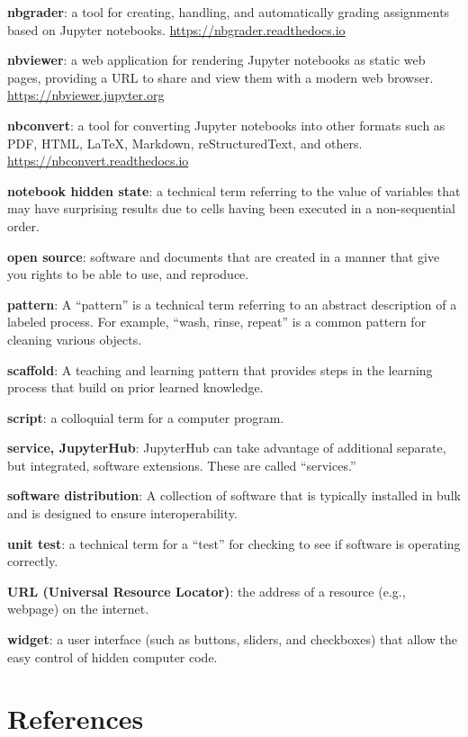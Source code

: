 \documentclass[]{book}
\begin{document}
\textbf{nbgrader}: a tool for creating, handling, and automatically grading assignments
based on Jupyter notebooks. \url{https://nbgrader.readthedocs.io}

\textbf{nbviewer}: a web application for rendering Jupyter notebooks as static web pages,
providing a URL to share and view them with a modern web browser. \url{https://nbviewer.jupyter.org}

\textbf{nbconvert}: a tool for converting Jupyter notebooks into other formats such as
PDF, HTML, LaTeX, Markdown, reStructuredText, and others. \url{https://nbconvert.readthedocs.io}

\textbf{notebook hidden state}: a technical term referring to the value of variables
that may have surprising results due to cells having been executed in a non-sequential order.

\textbf{open source}: software and documents that are created in a manner that give you
rights to be able to use, and reproduce.

\textbf{pattern}: A ``pattern'' is a technical term referring to an abstract description
of a labeled process. For example, ``wash, rinse, repeat'' is a common pattern for
cleaning various objects.

\textbf{scaffold}: A teaching and learning pattern that provides steps in the
learning process that build on prior learned knowledge.

\textbf{script}: a colloquial term for a computer program.

\textbf{service, JupyterHub}: JupyterHub can take advantage of additional separate,
but integrated, software extensions. These are called ``services.''

\textbf{software distribution}: A collection of software that is typically installed
in bulk and is designed to ensure interoperability.

\textbf{unit test}: a technical term for a ``test'' for checking to see if software is operating correctly.

\textbf{URL (Universal Resource Locator)}: the address of a resource (e.g., webpage) on the internet.

\textbf{widget}: a user interface (such as buttons, sliders, and checkboxes) that allow
the easy control of hidden computer code.

\hypertarget{references}{%
\chapter*{References}\label{references}}
\end{document}
